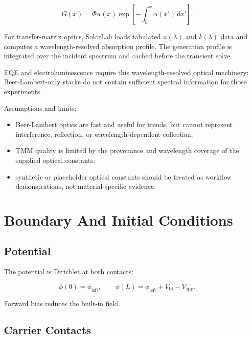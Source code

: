 \documentclass[
  11pt,
  american,
]{report}
\providecommand{\tightlist}{%
  \setlength{\itemsep}{0pt}\setlength{\parskip}{0pt}}
\begin{document}
\begin{equation}
\label{eq:beer-lambert}
G(x)
=
\Phi \alpha(x)
\exp\left[
-\int_0^x \alpha(x')\,dx'
\right].
\end{equation}

For transfer-matrix optics, SolarLab loads tabulated \(n(\lambda)\) and
\(k(\lambda)\) data and computes a wavelength-resolved absorption
profile. The generation profile is integrated over the incident spectrum
and cached before the transient solve.

EQE and electroluminescence require this wavelength-resolved optical
machinery; Beer-Lambert-only stacks do not contain sufficient spectral
information for those experiments.

Assumptions and limits:

\begin{itemize}
\tightlist
\item
  Beer-Lambert optics are fast and useful for trends, but cannot
  represent interference, reflection, or wavelength-dependent
  collection;
\item
  TMM quality is limited by the provenance and wavelength coverage of
  the supplied optical constants;
\item
  synthetic or placeholder optical constants should be treated as
  workflow demonstrations, not material-specific evidence.
\end{itemize}

\hypertarget{boundary-and-initial-conditions}{%
\chapter{Boundary And Initial
Conditions}\label{boundary-and-initial-conditions}}

\hypertarget{potential}{%
\section{Potential}\label{potential}}

The potential is Dirichlet at both contacts:

\[
\phi(0)=\phi_\mathrm{left},
\qquad
\phi(L)=\phi_\mathrm{left}+V_\mathrm{bi}-V_\mathrm{app}.
\]

Forward bias reduces the built-in field.

\hypertarget{carrier-contacts}{%
\section{Carrier Contacts}\label{carrier-contacts}}
\end{document}
